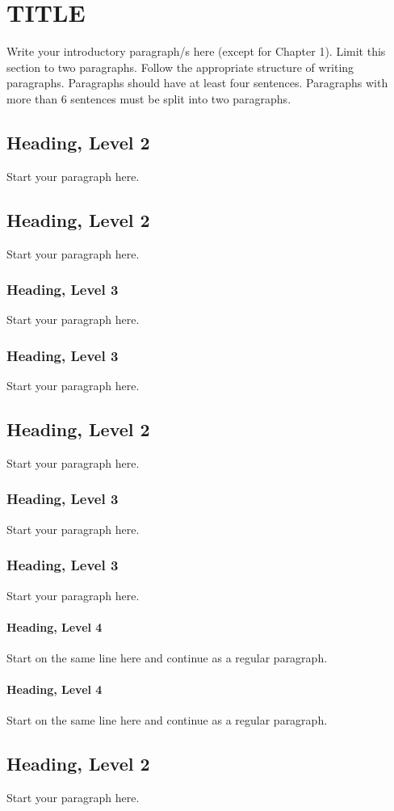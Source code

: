 \setlength{\parindent}{0.5in}
\setlength{\parskip}{0mm}
\setlength{\baselineskip}{1.6em}

\chapter{TITLE}
Write your introductory paragraph/s here (except for Chapter 1). Limit this section to two paragraphs. Follow the appropriate structure of writing paragraphs. Paragraphs should have at least four sentences. Paragraphs with more than 6 sentences must be split into two paragraphs.

\section{Heading, Level 2}
Start your paragraph here.
\section{Heading, Level 2}
Start your paragraph here.
\subsection{Heading, Level 3}
Start your paragraph here.
\subsection{Heading, Level 3}
Start your paragraph here.
\section{Heading, Level 2}
Start your paragraph here.
\subsection{Heading, Level 3}
Start your paragraph here.
\subsection{Heading, Level 3}
Start your paragraph here.
\subsubsection{Heading, Level 4}
Start on the same line here and continue as a regular paragraph.
\subsubsection{Heading, Level 4}
Start on the same line here and continue as a regular paragraph.
\section{Heading, Level 2}
Start your paragraph here.